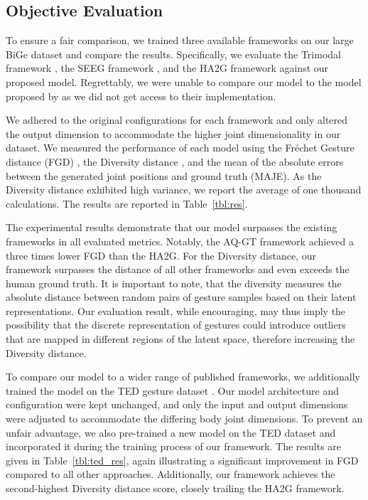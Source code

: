 \documentclass[sigconf]{acmart}
\begin{document}
\subsection{Objective Evaluation}
To ensure a fair comparison, we trained three available frameworks on our large BiGe dataset and compare the results. Specifically, we evaluate the Trimodal framework \cite{yoonSpeechGestureGeneration2020}, the SEEG framework \cite{liangSEEGSemanticEnergized2022}, and the HA2G framework \cite{liuLearningHierarchicalCrossModal2022a} against our proposed model. Regrettably, we were unable to compare our model to the model proposed by \citet{aoRhythmicGesticulatorRhythmAware2022a} as we did not get access to their implementation.

We adhered to the original configurations for each framework and only altered the output dimension to accommodate the higher joint dimensionality in our dataset. We measured the performance of each model using the Fréchet Gesture distance (FGD) \cite{yoonSpeechGestureGeneration2020}, the Diversity distance \cite{liuLearningHierarchicalCrossModal2022a}, and the mean of the absolute errors between the generated joint positions and ground truth (MAJE). As the Diversity distance exhibited high variance, we report the average of one thousand calculations. The results are reported in Table~\ref{tbl:res}.

The experimental results demonstrate that our model surpasses the existing frameworks in all evaluated metrics. Notably, the AQ-GT framework achieved a three times lower FGD than the HA2G. For the Diversity distance, our framework surpasses the distance of all other frameworks and even exceeds the human ground truth. It is important to note, that the diversity measures the absolute distance between random pairs of gesture samples based on their latent representations. Our evaluation result, while encouraging, may thus imply the possibility that the discrete representation of gestures could introduce outliers that are mapped in different regions of the latent space, therefore increasing the Diversity distance. 

To compare our model to a wider range of published frameworks, we additionally trained the model on the TED gesture dataset \cite{yoonRobotsLearnSocial2019a}. Our model architecture and configuration were kept unchanged, and only the input and output dimensions were adjusted to accommodate the differing body joint dimensions. To prevent an unfair advantage, we also pre-trained a new  model on the TED dataset and incorporated it during the training process of our framework. The results are given in Table~\ref{tbl:ted_res}, again illustrating a significant improvement in FGD compared to all other approaches. Additionally, our framework achieves the second-highest Diversity distance score, closely trailing the HA2G framework. 
\end{document}
